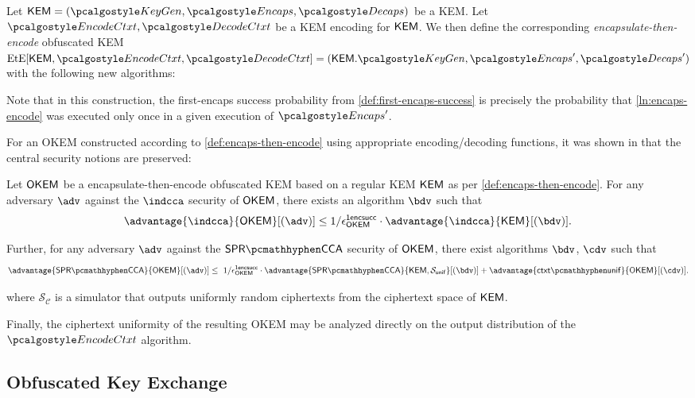 \begin{definition}
\label{def:encaps-then-encode}
    Let $\KEM = (\kgen, \encaps, \decaps)$ be a KEM.
    Let $\encodectxt, \decodectxt$ be a KEM encoding for $\mathsf{KEM}$.
    We then define the corresponding \emph{encapsulate-then-encode} obfuscated KEM $\ete[\KEM, \encodectxt, \decodectxt] = (\KEM.\kgen, \encaps', \decaps')$ with the following new algorithms:

    
\end{definition}

Note that in this construction, the first-encaps success probability from \cref{def:first-encaps-success} is precisely the probability that \cref{ln:encaps-encode} was executed only once in a given execution of $\encaps'$.

For an OKEM constructed according to \cref{def:encaps-then-encode} using appropriate encoding/decoding functions, it was shown in \cite[Theorems 2.12 and 2.13]{CCS:GunSteVei24} that the central security notions are preserved:

\begin{theorem}
\label{thm:encaps-then-encode-security}
    Let $\mathsf{OKEM}$ be a encapsulate-then-encode obfuscated KEM based on a regular KEM $\mathsf{KEM}$ as per \cref{def:encaps-then-encode}.
    For any adversary $\adv$ against the $\indcca$ security of $\mathsf{OKEM}$, there exists an algorithm $\bdv$ such that
    \[
        \advantage{\indcca}{\OKEM}[(\adv)]
        \leq
        1/\epsilon^\firstencapssuccess_\OKEM
        \cdot \advantage{\indcca}{\KEM}[(\bdv)].
    \]

    Further, for any adversary $\adv$ against the $\sprcca$ security of $\mathsf{OKEM}$, there exist algorithms $\bdv$, $\cdv$ such that
    \[
        \advantage{\sprcca}{\OKEM}[(\adv)]
        \leq\ 
        1/\epsilon^\firstencapssuccess_\OKEM
        \cdot \advantage{\sprcca}{\KEM, \mathcal S_\mathsf{unif}}[(\bdv)]
        + \advantage{\ctxtunif}{\OKEM}[(\cdv)].
    \]
    
    where $\mathcal S_\mathcal{C}$ is a simulator that outputs uniformly random ciphertexts from the ciphertext space of $\mathsf{KEM}$.
\end{theorem}

Finally, the ciphertext uniformity of the resulting OKEM may be analyzed directly on the output distribution of the $\encodectxt$ algorithm.

\subsection{Obfuscated Key Exchange}


